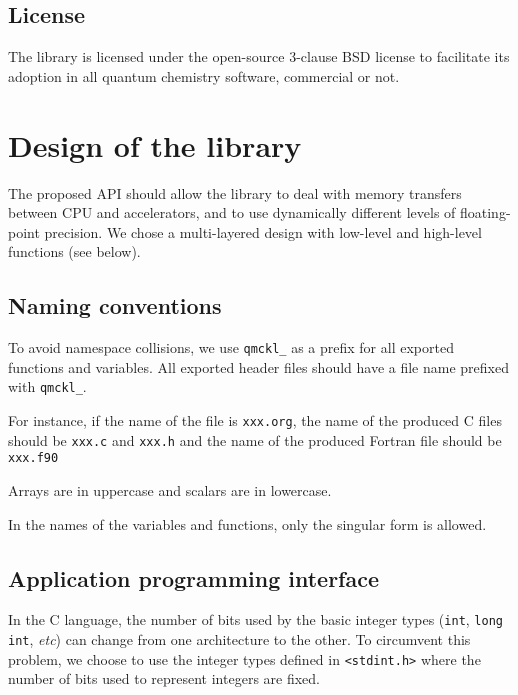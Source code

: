 \subsection{License}

The library is licensed under the open-source 3-clause BSD license to facilitate
its adoption in all quantum chemistry software, commercial or not.


\section{Design of the library}

The proposed \ac{API} should allow the library to deal with memory
transfers between CPU and accelerators, and to use dynamically
different levels of floating-point precision.  We chose a
multi-layered design with low-level and high-level functions (see
below).

\subsection{Naming conventions}

To avoid namespace collisions, we use \texttt{qmckl_} as a prefix for
all exported functions and variables.  All exported header files
should have a file name prefixed with \texttt{qmckl_}.

For instance, if the name of the {\orgmode} file is
\texttt{xxx.org}, the name of the produced C files should
be \texttt{xxx.c} and \texttt{xxx.h} and the
name of the produced Fortran file should be
\texttt{xxx.f90}

Arrays are in uppercase and scalars are in lowercase.

In the  names of  the variables and  functions, only the singular
form is allowed.

\subsection{Application programming interface}

In the C language, the number of bits used by the basic integer types
(\texttt{int}, \texttt{long int}, \textit{etc}) can
change from one architecture to the other. To circumvent this
problem, we choose to use the integer types defined in
\texttt{<stdint.h>} where the number of bits used to represent
integers are fixed.

